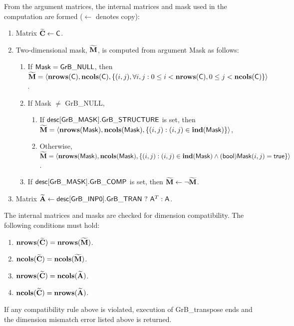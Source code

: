 From the argument matrices, the internal matrices and mask used in 
the computation are formed ($\leftarrow$ denotes copy):
\begin{enumerate}
	\item Matrix ${\bf \widetilde{C}} \leftarrow {\sf C}$.

	\item Two-dimensional mask, ${\bf \widetilde{M}}$, is computed from
    argument {\sf Mask} as follows:
	\begin{enumerate}
		\item If ${\sf Mask} = {\sf GrB\_NULL}$, then ${\bf \widetilde{M}} = 
        \langle \bold{nrows}({\sf C}), \bold{ncols}({\sf C}), \{(i,j), 
        \forall i,j : 0 \leq i <  \bold{nrows}({\sf C}), 0 \leq j < 
        \bold{ncols}({\sf C}) \} \rangle$.

		\item If {\sf Mask} $\ne$ {\sf GrB\_NULL},
        \begin{enumerate}
            \item If ${\sf desc[GrB\_MASK].GrB\_STRUCTURE}$ is set, then 
            ${\bf \widetilde{M}} = \langle \bold{nrows}({\sf Mask}), 
            \bold{ncols}({\sf Mask}), \{(i,j) : (i,j) \in \bold{ind}({\sf Mask}) \} \rangle$,
            \item Otherwise, ${\bf \widetilde{M}} = \langle \bold{nrows}({\sf Mask}), 
            \bold{ncols}({\sf Mask}), \\ \{(i,j) : (i,j) \in \bold{ind}({\sf Mask}) \wedge 
            ({\sf bool}){\sf Mask}(i,j) = {\sf true}\} \rangle$.
        \end{enumerate}

		\item	If ${\sf desc[GrB\_MASK].GrB\_COMP}$ is set, then 
        ${\bf \widetilde{M}} \leftarrow \neg {\bf \widetilde{M}}$.
	\end{enumerate}

	\item Matrix ${\bf \widetilde{A}} \leftarrow
    {\sf desc[GrB\_INP0].GrB\_TRAN} \ ? \ {\sf A}^T : {\sf A}$.
\end{enumerate}

The internal matrices and masks are checked for dimension compatibility. The following
conditions must hold:
\begin{enumerate}
	\item $\bold{nrows}({\bf \widetilde{C}}) = \bold{nrows}({\bf \widetilde{M}})$.

	\item $\bold{ncols}({\bf \widetilde{C}}) = \bold{ncols}({\bf \widetilde{M}})$.

	\item $\bold{nrows}({\bf \widetilde{C}}) = \bold{ncols}({\bf \widetilde{A}})$.

	\item $\bold{ncols}({\bf \widetilde{C}}) = \bold{nrows}({\bf \widetilde{A}})$.
\end{enumerate}
If any compatibility rule above is violated, execution of {\sf GrB\_transpose} ends and
the dimension mismatch error listed above is returned.

